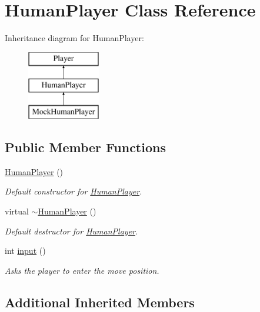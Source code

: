 \hypertarget{classHumanPlayer}{}\section{Human\+Player Class Reference}
\label{classHumanPlayer}
Inheritance diagram for Human\+Player\+:\begin{figure}[H]
\begin{center}
\leavevmode
\includegraphics[height=3.000000cm]{classHumanPlayer}
\end{center}
\end{figure}
\subsection*{Public Member Functions}
\begin{DoxyCompactItemize}
\item 
\mbox{\hyperlink{classHumanPlayer_a1cae7389c9855d4ec4e8f69cbe37e372}{Human\+Player}} ()
\begin{DoxyCompactList}\small\item\em Default constructor for \mbox{\hyperlink{classHumanPlayer}{Human\+Player}}. \end{DoxyCompactList}\item 
virtual \mbox{\hyperlink{classHumanPlayer_abdeb9d120fc74c8d82ec0c688883f16f}{$\sim$\+Human\+Player}} ()
\begin{DoxyCompactList}\small\item\em Default destructor for \mbox{\hyperlink{classHumanPlayer}{Human\+Player}}. \end{DoxyCompactList}\item 
int \mbox{\hyperlink{classHumanPlayer_a8281fe260b25edc4451fd15ae182707f}{input}} ()
\begin{DoxyCompactList}\small\item\em Asks the player to enter the move position. \end{DoxyCompactList}\end{DoxyCompactItemize}
\subsection*{Additional Inherited Members}


